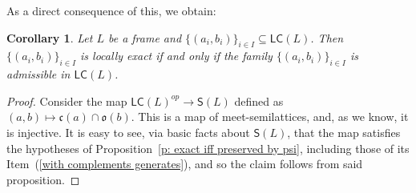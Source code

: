 \documentclass[11pt,a4paper,reqno]{amsart}
\newcommand{\tbigvee}{\mathop{\textstyle \bigvee }}%
\def\SS{\mathsf{S}}
\def\cl{\mathfrak{c}}
\def\op{\mathfrak{o}}
\newtheorem{theorem}{Theorem}[section]
\newtheorem{corollary}[theorem]{Corollary}
\theoremstyle{definition}
\theoremstyle{remark}
\newcommand{\mf}{\mathsf}
\newcommand{\sll}{\mf{S}(L)}
\begin{document}
{As a direct consequence of this, we obtain:
\begin{corollary}\label{t: locally exact meet iff exact meet}
Let $L$ be a frame and $\{ (a_i,b_i) \}_{i\in I}\subseteq \mathsf{LC}(L)$. Then $\{ (a_i,b_i) \}_{i\in I}$ is locally exact if and only if the family $\{(a_i,b_i)\}_{i\in I}$ is admissible in $\mathsf{LC}(L)$.    
\end{corollary}
\begin{proof}
    Consider the map $\mf{LC}(L)^{op}\to \mf{S}(L)$ defined as $(a,b)\mapsto \cl(a)\cap \op(b)$. This is a map of meet-semilattices, and, as we know, it is injective. It is easy to see, via basic facts about $\sll$, that the map satisfies the hypotheses of Proposition~\ref{p: exact iff preserved by psi}, including those of its Item~(\ref{with complements generates}), and so the claim follows from said proposition.
\end{proof}

}
\end{document}
